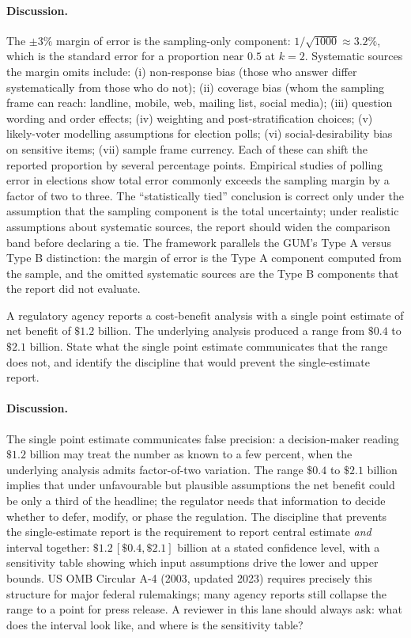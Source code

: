 \paragraph{Discussion.}
The $\pm 3\%$ margin of error is the sampling-only component:
$1/\sqrt{1000} \approx 3.2\%$, which is the standard error for
a proportion near $0.5$ at $k = 2$. Systematic sources the margin
omits include: (i) non-response bias (those who answer differ
systematically from those who do not); (ii) coverage bias (whom
the sampling frame can reach: landline, mobile, web, mailing
list, social media); (iii) question wording and order effects;
(iv) weighting and post-stratification choices; (v) likely-voter
modelling assumptions for election polls; (vi) social-desirability
bias on sensitive items; (vii) sample frame currency. Each of
these can shift the reported proportion by several percentage
points. Empirical studies of polling error in elections show
total error commonly exceeds the sampling margin by a factor of
two to three. The ``statistically tied'' conclusion is correct
only under the assumption that the sampling component is the
total uncertainty; under realistic assumptions about systematic
sources, the report should widen the comparison band before
declaring a tie. The framework parallels the GUM's Type A
versus Type B distinction: the margin of error is the Type A
component computed from the sample, and the omitted systematic
sources are the Type B components that the report did not
evaluate.

\begin{exercise}
A regulatory agency reports a cost-benefit analysis with a single
point estimate of net benefit of $\$1.2$ billion. The underlying
analysis produced a range from $\$0.4$ to $\$2.1$ billion. State
what the single point estimate communicates that the range does
not, and identify the discipline that would prevent the
single-estimate report.
\end{exercise}

\paragraph{Discussion.}
The single point estimate communicates false precision: a
decision-maker reading $\$1.2$ billion may treat the number as
known to a few percent, when the underlying analysis admits
factor-of-two variation. The range $\$0.4$ to $\$2.1$ billion
implies that under unfavourable but plausible assumptions the
net benefit could be only a third of the headline; the regulator
needs that information to decide whether to defer, modify, or
phase the regulation. The discipline that prevents the
single-estimate report is the requirement to report central
estimate \emph{and} interval together: $\$1.2 \,[\$0.4, \$2.1]$
billion at a stated confidence level, with a sensitivity table
showing which input assumptions drive the lower and upper bounds.
US OMB Circular A-4 (2003, updated 2023) requires precisely this
structure for major federal rulemakings; many agency reports
still collapse the range to a point for press release. A reviewer
in this lane should always ask: what does the interval look
like, and where is the sensitivity table?

